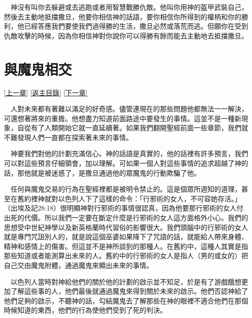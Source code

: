 \documentclass{book}
\begin{document}
　神沒有叫你去躲避或去逃跑或者用智慧戰勝仇敵。他叫你用神的盔甲武裝自己，然後去主動地抵擋撒旦，他要你相信神的話語，要你相信你所得到的權柄和你的勝利，他已經答應我們要使我們過得勝的生活，撒旦必然或落荒而逃。但願你在受到仇敵攻擊的時候，因為你相信神對你說你可以得勝有餘而能去主動地去抵擋撒旦。

\chapter{與魔鬼相交}
\label{sec:ch19}
\hyperref[sec:ch18]{[上一章]}
\hyperlink{toc}{[返主目錄]}
\hyperref[sec:ch20]{[下一章]}

\begin{center}
\noindent{}
\end{center}

　人對未來都有著難以滿足的好奇感。儘管連現在的那些問題他都無法一一解決，可還想著將來的重擔。他想盡力知道前面路途中要發生的事情。這並不是一種新現象，自從有了人類開始它就一直延續著。如果我們翻開聖經前面一些章節，我們就不難發現人們一直都在探索著未來的事情。

　神要我們對他的計劃充滿信心。神的話語是真實的，他的話裡有許多預言，我們可以對這些預言仔細領會，加以理解。可如果一個人對這些事情的追求超越了神的話，那他就是被迷惑了，是撒旦通過他的眾魔鬼的行動欺騙了他。

　任何與魔鬼交易的行為在聖經裡都是被明令禁止的。這是個眾所週知的道理，甚至在舊約裡神就對以色列人下了這樣的命令：「行邪術的女人，不可容她存活。」（出埃及記28:18）很明顯神對行邪術的事情很認真，因為他要那行邪術的女人付出死的代價。所以我們一定要在斷定什麼是行邪術的女人這方面格外小心。我們的思想受中世紀神學以及新英格蘭時代習俗的影響很大。我們頭腦中的行邪術的女人就是專門咒詛別人的，就是說這個巫婆如果降下了咒語的話，就能給人帶來身體、精神和感情上的傷害。但這並不是神所談到的那種人。在舊約中，這種人其實是指那些知道或者能測算出未來的人。舊約中的行邪術的女人是指人（男的或女的）把自己交由魔鬼附體，通過魔鬼來顯出未來的事情。

　以色列人當時對神給他們的關於他的計劃的啟示並不知足，於是有了游戲餓想更加了解這些事的人，他們最後就通過魔鬼來得到關於未來的啟示。他們否認神給了他們足夠的啟示，不聽神的話，勾結魔鬼去了解那些在神的眼裡不適合他們在那個時候知道的東西，他們的行為使他們受到了死的判決。
\end{document}
